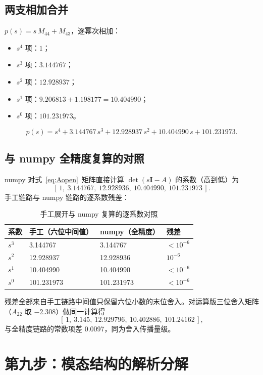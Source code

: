 \documentclass[11pt,a4paper]{ctexart}
\begin{document}
\subsection{两支相加合并}

$p(s)=s\,M_{44}+M_{43}$，逐幂次相加：
\begin{itemize}[itemsep=1pt]
  \item $s^4$ 项：$1$；
  \item $s^3$ 项：$3.144767$；
  \item $s^2$ 项：$12.928937$；
  \item $s^1$ 项：$9.206813+1.198177 = 10.404990$；
  \item $s^0$ 项：$101.231973$。
\end{itemize}
\begin{equation}\label{eq:8-4}
\boxed{\;p(s) = s^4 + 3.144767\,s^3 + 12.928937\,s^2 + 10.404990\,s + 101.231973.\;}
\tag{(8-4)}
\end{equation}

\subsection{与 numpy 全精度复算的对照}

numpy 对式~\eqref{eq:Aopen}~矩阵直接计算 $\det(s\mathbf{I}-A)$ 的系数（高到低）为
\[
[\,1,\ 3.144767,\ 12.928936,\ 10.404990,\ 101.231973\,].
\]
手工链路与 numpy 链路的逐系数残差：

\begin{table}[htbp]
\centering\small
\begin{tabular}{llll}
\toprule
系数 & 手工（六位中间值） & numpy（全精度） & 残差 \\
\midrule
$s^3$ & 3.144767 & 3.144767 & $<10^{-6}$ \\
$s^2$ & 12.928937 & 12.928936 & $10^{-6}$ \\
$s^1$ & 10.404990 & 10.404990 & $<10^{-6}$ \\
$s^0$ & 101.231973 & 101.231973 & $<10^{-6}$ \\
\bottomrule
\end{tabular}
\caption{手工展开与 numpy 复算的逐系数对照}
\end{table}

残差全部来自手工链路中间值只保留六位小数的末位舍入。对运算版三位舍入矩阵（$A_{22}$ 取 $-2.308$）做同一计算得
\[
[\,1,\ 3.145,\ 12.929796,\ 10.402886,\ 101.24162\,],
\]
与全精度链路的常数项差 0.0097，同为舍入传播量级。

\section{第九步：模态结构的解析分解}\label{sec:modal}
\end{document}
